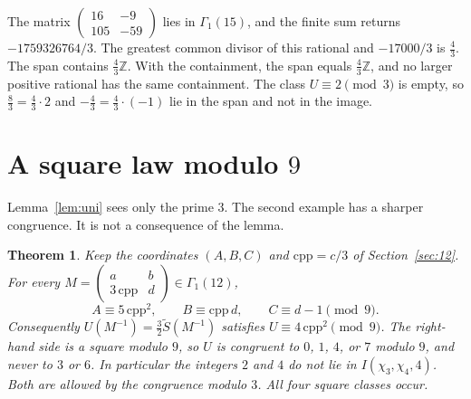 \documentclass[11pt]{article}
\newtheorem{theorem}{Theorem}
\theoremstyle{remark}
\newcommand{\tS}{\widetilde{S}}
\newcommand{\Z}{\mathbb{Z}}
\begin{document}
The matrix \(\begin{pmatrix}16&-9\\105&-59\end{pmatrix}\) lies in \(\Gamma_1(15)\), and the finite sum returns \(-1759326764/3\).
The greatest common divisor of this rational and \(-17000/3\) is \(\tfrac43\).
The span contains \(\tfrac43\Z\).
With the containment, the span equals \(\tfrac43\Z\), and no larger positive rational has the same containment.
The class \(U\equiv 2\pmod{3}\) is empty, so \(\tfrac83=\tfrac43\cdot 2\) and \(-\tfrac43=\tfrac43\cdot(-1)\) lie in the span and not in the image.

\section{A square law modulo \(9\)}
\label{sec:mod9}

Lemma~\ref{lem:uni} sees only the prime \(3\).
The second example has a sharper congruence.
It is not a consequence of the lemma.

\begin{theorem}
\label{thm:mod9}
Keep the coordinates \((A,B,C)\) and \(\mathrm{cpp}=c/3\) of Section~\ref{sec:12}.
For every \(M=\begin{pmatrix}a&b\\3\,\mathrm{cpp}&d\end{pmatrix}\in\Gamma_1(12)\),
\begin{equation}
\label{eq:mod9}
A\equiv 5\,\mathrm{cpp}^2,\qquad B\equiv \mathrm{cpp}\,d,\qquad C\equiv d-1\pmod{9}.
\end{equation}
Consequently \(U(M^{-1})=\tfrac32\tS(M^{-1})\) satisfies \(U\equiv 4\,\mathrm{cpp}^2\pmod{9}\).
The right-hand side is a square modulo \(9\), so \(U\) is congruent to \(0\), \(1\), \(4\), or \(7\) modulo \(9\), and never to \(3\) or \(6\).
In particular the integers \(2\) and \(4\) do not lie in \(I(\chi_3,\chi_4,4)\).
Both are allowed by the congruence modulo \(3\).
All four square classes occur.
\end{theorem}
\end{document}
